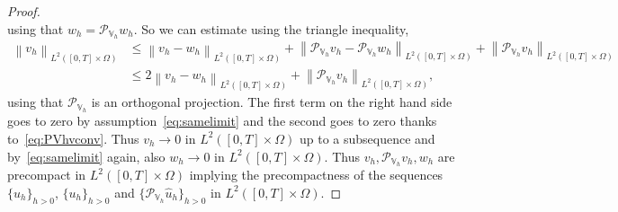 \documentclass[10pt,a4paper]{amsart}
\newcommand\norm[1]{\left\lVert#1\right\rVert}
\newcommand{\PVh}{\mathcal{P}_{\Vh}}
\newcommand{\Vh}{\mathbb{V}_h}
\newcommand{\dom}{\Omega}
\newcommand{\hu}{\widehat{u}}
\begin{document}
\begin{proof}
\begin{equation*}
	\end{equation*}
	using that $w_h = \PVh w_h$. So we can estimate using the triangle inequality,
	\begin{align*}
		\norm{v_h}_{L^2([0,T]\times\dom)}&\leq \norm{v_h-w_h}_{L^2([0,T]\times\dom)} + \norm{\PVh v_h-\PVh w_h}_{L^2([0,T]\times\dom)} + \norm{\PVh v_h}_{L^2([0,T]\times\dom)}\\
		&\leq 2\norm{v_h-w_h}_{L^2([0,T]\times\dom)}   + \norm{\PVh v_h}_{L^2([0,T]\times\dom)},
	\end{align*}
	using that $\PVh$ is an orthogonal projection. The first term on the right hand side goes to zero by assumption~\eqref{eq:samelimit} and the second goes to zero thanks to~\eqref{eq:PVhvconv}. Thus $v_h\to 0$ in $L^2([0,T]\times\dom)$ up to a subsequence and by~\eqref{eq:samelimit} again, also $w_h\to 0$ in $L^2([0,T]\times\dom)$.
	Thus $v_h, \PVh v_h,w_h$ are precompact in $L^2([0,T]\times\dom)$ implying the precompactness of the sequences $\{\hu_h\}_{h>0}$, $\{u_h\}_{h>0}$ and $\{\PVh \hu_h\}_{h>0}$ in $L^2([0,T]\times\dom)$.
\end{proof}
\end{document}
